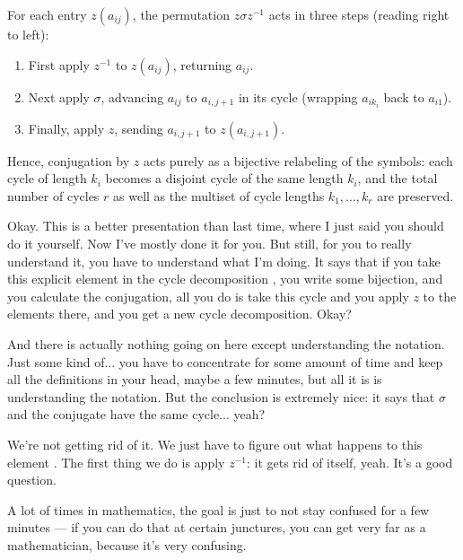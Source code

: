 \begin{content}
\begin{steps}
For each entry $z(a_{ij})$, the permutation $z \sigma z^{-1}$ acts in three steps (reading right to left):
\begin{enumerate}[label=\textbf{\arabic*.}]
    \item First apply $z^{-1}$ to $z(a_{ij})$, returning $a_{ij}$.
    \item Next apply $\sigma$, advancing $a_{ij}$ to $a_{i, j+1}$ in its cycle (wrapping $a_{i k_i}$ back to $a_{i1}$).
    \item Finally, apply $z$, sending $a_{i, j+1}$ to $z(a_{i, j+1})$.
\end{enumerate}
Hence, conjugation by $z$ acts purely as a bijective relabeling of the symbols: each cycle of length $k_i$ becomes a disjoint cycle of the same length $k_i$, and the total number of cycles $r$ as well as the multiset of cycle lengths $k_1, \dots, k_r$ are preserved.
\end{steps}
\end{content}

\begin{hidden}
\end{hidden}

\begin{speech}[00:37:24 - 00:38:57]
Okay. This is a better presentation than last time, where I just said you should do it yourself. Now I've mostly done it for you. But still, for you to really understand it, you have to understand what I'm doing. It says that if you take this explicit element in the cycle decomposition , you write some bijection, and you calculate the conjugation, all you do is take this cycle and you apply $z$ to the elements there, and you get a new cycle decomposition. Okay?

And there is actually nothing going on here except understanding the notation. Just some kind of... you have to concentrate for some amount of time and keep all the definitions in your head, maybe a few minutes, but all it is is understanding the notation. But the conclusion is extremely nice: it says that $\sigma$ and the conjugate have the same cycle... yeah? 

We're not getting rid of it. We just have to figure out what happens to this element . The first thing we do is apply $z^{-1}$: it gets rid of itself, yeah. It's a good question.

A lot of times in mathematics, the goal is just to not stay confused for a few minutes --- if you can do that at certain junctures, you can get very far as a mathematician, because it's very confusing.
\end{speech}

